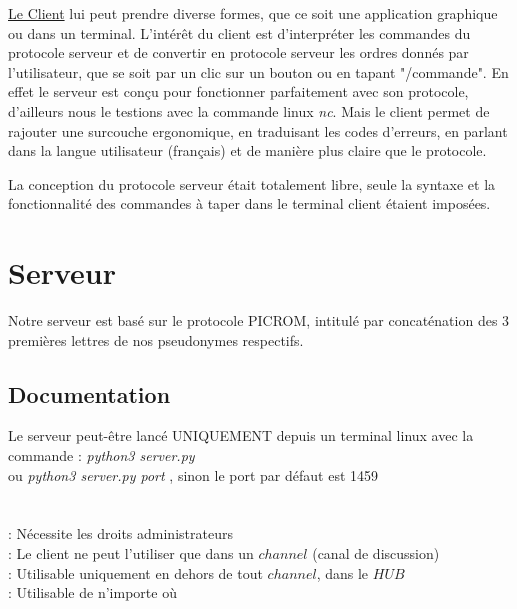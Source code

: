\documentclass[12pt]{article}
\begin{document}
\underline{Le Client} lui peut prendre diverse formes, que ce soit une application graphique
ou dans un terminal. L'intérêt du client est d'interpréter les commandes du protocole serveur
et de convertir en protocole serveur les ordres donnés par l'utilisateur, que se soit par un
clic sur un bouton ou en tapant "/commande". En effet le serveur est conçu pour fonctionner
parfaitement avec son protocole, d'ailleurs nous le testions avec la commande linux \emph{nc}.
Mais le client permet de rajouter une surcouche ergonomique, en traduisant les codes d'erreurs,
en parlant dans la langue utilisateur (français) et de manière plus claire que le protocole.

La conception du protocole serveur était totalement libre, seule la syntaxe et
la fonctionnalité des commandes
à taper dans le terminal client étaient imposées.


\section{Serveur}
Notre serveur est basé sur le protocole PICROM, intitulé par concaténation des
3 premières lettres de nos pseudonymes respectifs.

\subsection{Documentation}
Le serveur peut-être lancé UNIQUEMENT depuis un terminal linux avec
la commande : \emph{python3 server.py}
\\ou \emph{python3 server.py port} , sinon le port par défaut est 1459
\\

\\

\\ : Nécessite les droits administrateurs
\\ : Le client ne peut l'utiliser que dans un $channel$ (canal de discussion)
\\ : Utilisable uniquement en dehors de tout $channel$, dans le $HUB$
\\ : Utilisable de n'importe où
\end{document}
